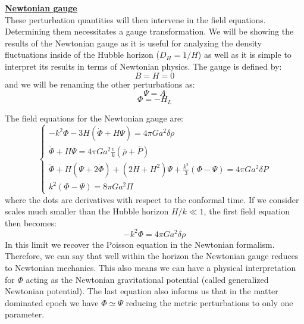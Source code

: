 \noindent \textbf{\underline{Newtonian gauge}} \\

These perturbation quantities will then intervene in the field equations. Determining them necessitates a gauge transformation. We will be showing the results 
of the Newtonian gauge as it is useful for analyzing the density fluctuations inside of the Hubble horizon ($D_H = 1/H$) as well as it is simple to interpret its results in terms of 
Newtonian physics. The gauge is defined by:
\begin{equation}
    B=H=0
\end{equation}
and we will be renaming the other perturbations as:
\begin{equation}
    \Psi = A
\end{equation}
\begin{equation}
    \Phi = -H_L
\end{equation}

The field equations for the Newtonian gauge are:
\begin{equation}
    \boxed{
    \begin{cases}
        -k^2 \Phi - 3H(\dot{\Phi} + H\Psi) = 4 \pi G a^2 \delta \rho \\
        \dot{\Phi} + H \Psi = 4 \pi G a^2 \frac{v}{k} (\bar{\rho} + \bar{P}) \\
        \ddot{\Phi} + H(\dot{\Psi} + 2\dot{\Phi}) + (2 \dot{H} + H^2)\Psi + \frac{k^2}{3}(\Phi - \Psi) = 4 \pi G a^2 \delta P \\
        k^2 (\Phi - \Psi) = 8 \pi G a^2 \Pi
    \end{cases}
    }
\end{equation}
where the dots are derivatives with respect to the conformal time. 
If we consider scales much smaller than the Hubble horizon $H/k \ll 1$, the first field equation then becomes:
\begin{equation}
    -k^2 \Phi = 4 \pi G a^2 \delta \rho
\end{equation}
In this limit we recover the Poisson equation in the Newtonian formalism. Therefore, we can say that well within the horizon the Newtonian gauge reduces to Newtonian mechanics. 
This also means we can have a physical interpretation for $\Phi$ acting as the Newtonian gravitational potential (called generalized Newtonian potential). The last equation 
also informs us that in the matter dominated epoch we have $\Phi \simeq \Psi$ reducing the metric perturbations to only one parameter. \\

